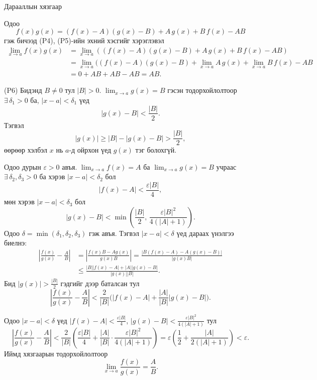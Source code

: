 \begin{frame}[allowframebreaks]{Дарааллын хязгаар}
\begin{prof}
Одоо
\[
f(x)g(x)=(f(x)-A)(g(x)-B)+A\,g(x)+B\,f(x)-AB
\]
гэж бичээд (P4), (P5)-ийн эхний хэсгийг хэрэглэвэл 
\begin{align*}
\lim_{x\to a}f(x)g(x)&=\lim_{x\to a}\left((f(x)-A)(g(x)-B)+A\,g(x)+B\,f(x)-AB\right)\\
&=\lim_{x\to a}((f(x)-A)(g(x)-B)+\lim_{x\to a}A\,g(x)+\lim_{x\to a} B\,f(x)-AB\\
&=0+AB+AB-AB=AB
.
\end{align*}

(P6)  Бидэнд $B\neq 0$ тул $|B|>0$.  
$\displaystyle\lim_{x\to a}g(x)=B$ гэсэн тодорхойлолтоор $\exists\,\delta_1>0$ ба, $|x-a|<\delta_1$ үед
\[
|g(x)-B|<\frac{|B|}{2}.
\]
Тэгвэл 
\[
|g(x)|\ge |B|-|g(x)-B|>\frac{|B|}{2},
\]
өөрөөр хэлбэл $x$ нь $a$-д ойрхон үед $g(x)$ тэг болохгүй.

Одоо дурын $\varepsilon>0$ авъя.  
$\displaystyle\lim_{x\to a}f(x)=A$ ба $\displaystyle\lim_{x\to a}g(x)=B$ учраас $\exists\,\delta_2,\delta_3>0$ ба хэрэв $|x-a|<\delta_2$ бол
\[
|f(x)-A|<\frac{\varepsilon |B|}{4},
\]
мөн хэрэв $|x-a|<\delta_3$ бол
\[
|g(x)-B|<\min\left(\frac{|B|}{2},\,\frac{\varepsilon |B|^2}{4(|A|+1)}\right).
\]
Одоо $\delta=\min(\delta_1,\delta_2,\delta_3)$ гэж авъя. Тэгвэл $|x-a|<\delta$ үед дараах үнэлгээ биелнэ:
\begin{align*}
\left|\frac{f(x)}{g(x)}-\frac{A}{B}\right|
&=\left|\frac{f(x)B-A g(x)}{g(x)B}\right|
=\frac{|B(f(x)-A)-A(g(x)-B)|}{|g(x)B|}\\[4pt]
&\le \frac{|B||f(x)-A|+|A||g(x)-B|}{|g(x)||B|}.
\end{align*}
Бид $|g(x)|>\frac{|B|}{2}$ гэдгийг дээр баталсан тул
\[
\left|\frac{f(x)}{g(x)}-\frac{A}{B}\right|
<\frac{2}{|B|}\Big(|f(x)-A|+\frac{|A|}{|B|}|g(x)-B|\Big).
\]

Одоо $|x-a|<\delta$ үед $|f(x)-A|<\frac{\varepsilon |B|}{4}$, $|g(x)-B|<\frac{\varepsilon |B|^2}{4(|A|+1)}$ тул
\[
\left|\frac{f(x)}{g(x)}-\frac{A}{B}\right|
<\frac{2}{|B|}\!\left(\frac{\varepsilon |B|}{4}+\frac{|A|}{|B|}\cdot\frac{\varepsilon |B|^2}{4(|A|+1)}\right)
=\varepsilon\left(\frac12+\frac{|A|}{2(|A|+1)}\right)
<\varepsilon.
\]
Иймд хязгаарын тодорхойлолтоор
\[
\lim_{x\to a}\frac{f(x)}{g(x)}=\frac{A}{B}.
\]
\end{prof}
\end{frame}

